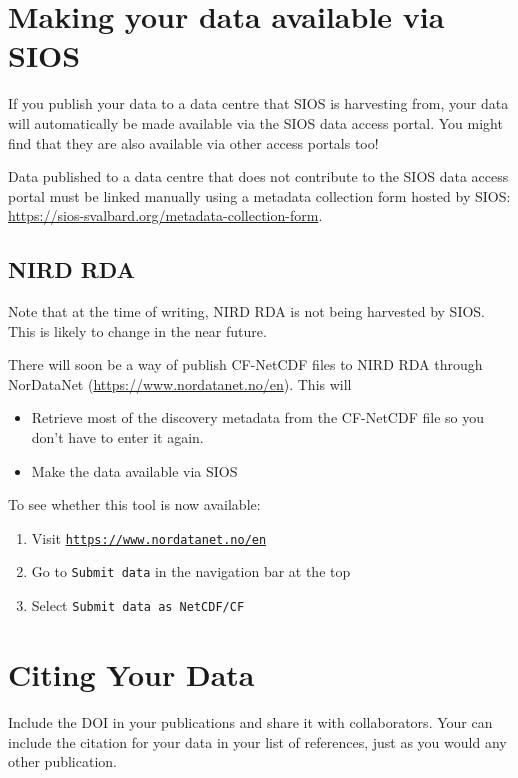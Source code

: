 \documentclass[a4paper,12pt]{article}
\begin{document}
\section{Making your data available via SIOS}
\label{sec: linking data to sios}

If you publish your data to a data centre that SIOS is harvesting from, your data will automatically be made available via the SIOS data access portal. You might find that they are also available via other access portals too!
 
Data published to a data centre that does not contribute to the SIOS data access portal must be linked manually using a metadata collection form hosted by SIOS: \url{https://sios-svalbard.org/metadata-collection-form}.

\subsection{NIRD RDA}

Note that at the time of writing, NIRD RDA is not being harvested by SIOS. This is likely to change in the near future. 

There will soon be a way of publish CF-NetCDF files to NIRD RDA through NorDataNet (\url{https://www.nordatanet.no/en}). This will
\begin{itemize}
\item Retrieve most of the discovery metadata from the CF-NetCDF file so you don't have to enter it again.
\item Make the data available via SIOS
\end{itemize}

To see whether this tool is now available: 

\begin{enumerate}[label=\arabic*.]
    \item Visit \href{https://www.nordatanet.no/en}{\texttt{https://www.nordatanet.no/en}}
    \item Go to \texttt{Submit data} in the navigation bar at the top
    \item Select \texttt{Submit data as NetCDF/CF}
\end{enumerate}

\section{Citing Your Data}

Include the DOI in your publications and share it with collaborators. Your can include the citation for your data in your list of references, just as you would any other publication. 
\end{document}
